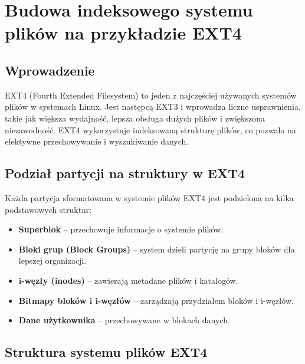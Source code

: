 \section{Budowa indeksowego systemu plików na przykładzie EXT4}

\subsection{Wprowadzenie}
EXT4 (Fourth Extended Filesystem) to jeden z najczęściej używanych systemów plików w systemach Linux. Jest następcą EXT3 i wprowadza liczne usprawnienia, takie jak większa wydajność, lepsza obsługa dużych plików i zwiększona niezawodność. EXT4 wykorzystuje indeksowaną strukturę plików, co pozwala na efektywne przechowywanie i wyszukiwanie danych.

\subsection{Podział partycji na struktury w EXT4}
Każda partycja sformatowana w systemie plików EXT4 jest podzielona na kilka podstawowych struktur:

\begin{itemize}
    \item \textbf{Superblok} – przechowuje informacje o systemie plików.
    \item \textbf{Bloki grup (Block Groups)} – system dzieli partycję na grupy bloków dla lepszej organizacji.
    \item \textbf{i-węzły (inodes)} – zawierają metadane plików i katalogów.
    \item \textbf{Bitmapy bloków i i-węzłów} – zarządzają przydziałem bloków i i-węzłów.
    \item \textbf{Dane użytkownika} – przechowywane w blokach danych.
\end{itemize}

\subsection{Struktura systemu plików EXT4}

